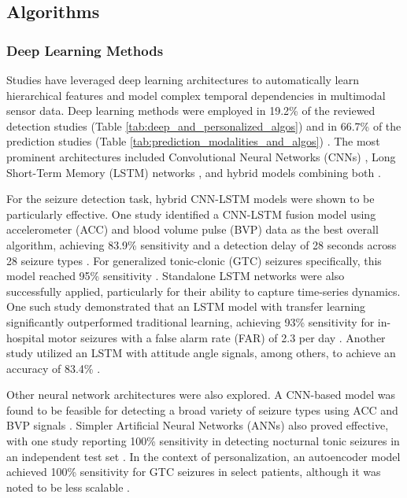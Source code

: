 \subsection{Algorithms}

\subsubsection{Deep Learning Methods}
Studies have leveraged deep learning architectures to automatically learn hierarchical features and model complex temporal dependencies in multimodal sensor data. Deep learning methods were employed in 19.2\% of the reviewed detection studies (Table \ref{tab:deep_and_personalized_algos}) \cite{Yu2023-ss, Nasseri2021-xn, Larsen2024-vn, Wang2025-ql, Tang2021-td} and in 66.7\% of the prediction studies (Table \ref{tab:prediction_modalities_and_algos}) \cite{Vieluf2023-ta, Meisel2020-ii}. The most prominent architectures included Convolutional Neural Networks (CNNs) \cite{Yu2023-ss, Tang2021-td}, Long Short-Term Memory (LSTM) networks \cite{Meisel2020-ii, Yu2023-ss, Wang2025-ql}, and hybrid models combining both \cite{Yu2023-ss}.

For the seizure detection task, hybrid CNN-LSTM models were shown to be particularly effective. One study identified a CNN-LSTM fusion model using accelerometer (ACC) and blood volume pulse (BVP) data as the best overall algorithm, achieving 83.9\% sensitivity and a detection delay of 28 seconds across 28 seizure types \cite{Yu2023-ss}. For generalized tonic-clonic (GTC) seizures specifically, this model reached 95\% sensitivity \cite{Yu2023-ss}. Standalone LSTM networks were also successfully applied, particularly for their ability to capture time-series dynamics. One such study demonstrated that an LSTM model with transfer learning significantly outperformed traditional learning, achieving 93\% sensitivity for in-hospital motor seizures with a false alarm rate (FAR) of 2.3 per day \cite{Nasseri2021-xn}. Another study utilized an LSTM with attitude angle signals, among others, to achieve an accuracy of 83.4\% \cite{Wang2025-ql}.

Other neural network architectures were also explored. A CNN-based model was found to be feasible for detecting a broad variety of seizure types using ACC and BVP signals \cite{Tang2021-td}. Simpler Artificial Neural Networks (ANNs) also proved effective, with one study reporting 100\% sensitivity in detecting nocturnal tonic seizures in an independent test set \cite{Larsen2024-vn}. In the context of personalization, an autoencoder model achieved 100\% sensitivity for GTC seizures in select patients, although it was noted to be less scalable \cite{Yu2023-ss}.

